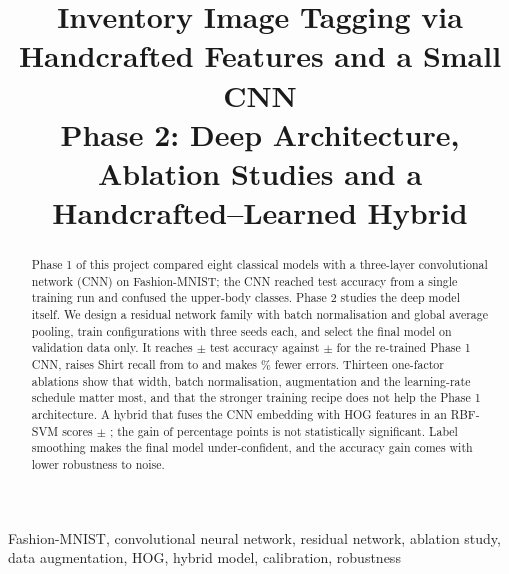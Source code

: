 \documentclass[conference]{IEEEtran}
\begin{document}
\title{Inventory Image Tagging via Handcrafted Features and a Small CNN\\
\large Phase 2: Deep Architecture, Ablation Studies and a Handcrafted--Learned Hybrid}

\author{
}

\maketitle

\begin{abstract}
Phase 1 of this project compared eight classical models with a three-layer convolutional network (CNN) on
Fashion-MNIST; the CNN reached \PhaseOneCnnAcc{} test accuracy from a single training run and confused the
upper-body classes. Phase 2 studies the deep model itself. We design a residual network family with batch
normalisation and global average pooling, train \NConfigs{} configurations with three seeds each, and select the
final model on validation data only. It reaches \TestFinal{} $\pm$ \TestFinalStd{} test accuracy against
\TestPone{} $\pm$ \TestPoneStd{} for the re-trained Phase 1 CNN, raises Shirt recall from \TestPoneShirt{} to
\TestFinalShirt{} and makes \ErrorReduction\% fewer errors. Thirteen one-factor ablations show that width, batch
normalisation, augmentation and the learning-rate schedule matter most, and that the stronger training recipe does
not help the Phase 1 architecture. A hybrid that fuses the CNN embedding with HOG features in an RBF-SVM scores
\TestHtwo{} $\pm$ \TestHtwoStd; the gain of \HtwoGain{} percentage points is not statistically significant.
Label smoothing makes the final model under-confident, and the accuracy gain comes with lower robustness to noise.
\end{abstract}

\begin{IEEEkeywords}
Fashion-MNIST, convolutional neural network, residual network, ablation study, data augmentation, HOG, hybrid model,
calibration, robustness
\end{IEEEkeywords}













\end{document}
